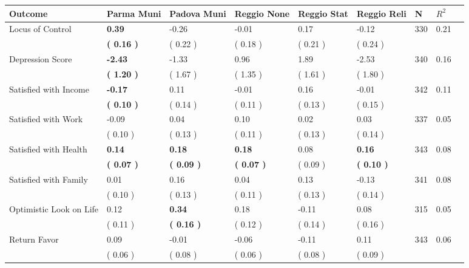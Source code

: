\begin{tabular}{L{6.2cm} C{1.8cm} C{1.8cm} C{1.8cm} C{1.8cm} C{1.8cm} C{1.8cm} C{0.3cm} C{0.3cm}}
\toprule
 \textbf{Outcome} & \textbf{Parma Muni} & \textbf{Padova Muni} & \textbf{Reggio None} & \textbf{Reggio Stat} & \textbf{Reggio Reli} & \textbf{N} & \textbf{$ R^2$} \\
\midrule
Locus of Control & \textbf{     0.39} &     -0.26 &     -0.01 &      0.17 &     -0.12  & 330 &       0.21 \\ 
 & \textbf{(     0.16 )} & (     0.22 ) & (     0.18 ) & (     0.21 ) & (     0.24 )  & \\
Depression Score & \textbf{    -2.43} &     -1.33 &      0.96 &      1.89 &     -2.53  & 340 &       0.16 \\ 
 & \textbf{(     1.20 )} & (     1.67 ) & (     1.35 ) & (     1.61 ) & (     1.80 )  & \\
Satisfied with Income & \textbf{    -0.17} &      0.11 &     -0.01 &      0.16 &     -0.01  & 342 &       0.11 \\ 
 & \textbf{(     0.10 )} & (     0.14 ) & (     0.11 ) & (     0.13 ) & (     0.15 )  & \\
Satisfied with Work &     -0.09 &      0.04 &      0.10 &      0.02 &      0.03  & 337 &       0.05 \\ 
 & (     0.10 ) & (     0.13 ) & (     0.11 ) & (     0.13 ) & (     0.14 )  & \\
Satisfied with Health & \textbf{     0.14} & \textbf{     0.18} & \textbf{     0.18} &      0.08 & \textbf{     0.16}  & 343 &       0.08 \\ 
 & \textbf{(     0.07 )} & \textbf{(     0.09 )} & \textbf{(     0.07 )} & (     0.09 ) & \textbf{(     0.10 )}  & \\
Satisfied with Family &      0.01 &      0.16 &      0.04 &      0.13 &     -0.13  & 341 &       0.08 \\ 
 & (     0.10 ) & (     0.13 ) & (     0.11 ) & (     0.13 ) & (     0.14 )  & \\
Optimistic Look on Life &      0.12 & \textbf{     0.34} &      0.18 &     -0.11 &      0.08  & 315 &       0.05 \\ 
 & (     0.11 ) & \textbf{(     0.16 )} & (     0.12 ) & (     0.14 ) & (     0.16 )  & \\
Return Favor &      0.09 &     -0.01 &     -0.06 &     -0.11 &      0.11  & 343 &       0.06 \\ 
 & (     0.06 ) & (     0.08 ) & (     0.06 ) & (     0.08 ) & (     0.09 )  & \\

\end{tabular}

